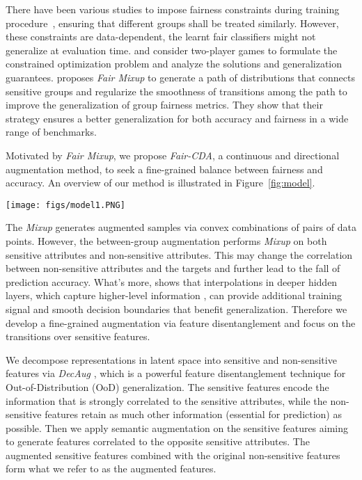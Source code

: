\documentclass[letterpaper]{article} %
\begin{document}
There have been various studies to impose fairness constraints during training procedure~\cite{Zemellearningfair,hardt2016equality,zafar2017fairness,chuang2021fair}, ensuring that different groups shall be treated similarly.
However, these constraints are data-dependent, the learnt fair classifiers might not generalize at evaluation time.
\citet{agarwal2018reductions} and \citet{cotter2019training} consider two-player games to formulate the constrained optimization problem and analyze the solutions and generalization guarantees.
\citet{chuang2021fair} proposes {\it Fair Mixup} to
generate a path of distributions that connects sensitive groups and regularize the smoothness of transitions among the path to improve the generalization of group fairness metrics. 
They show that their strategy ensures a better generalization for both accuracy and fairness in a wide range of benchmarks. 

Motivated by {\it Fair Mixup}, we propose {\it Fair-CDA}, a continuous and directional augmentation method, to seek a fine-grained balance between fairness and accuracy. An overview of our method is illustrated in Figure~\ref{fig:model}.


\begin{figure*}[t]
\centering
\texttt{[image: figs/model1.PNG]}
\caption{An overview of the proposed Fair-CDA.}
\label{fig:model}
\end{figure*}


 The {\it Mixup} \cite{zhang2018mixup} generates augmented samples via convex combinations of pairs
of data points. However, the between-group augmentation performs {\it Mixup} on both sensitive attributes and non-sensitive attributes.
This may change the correlation between non-sensitive attributes and the targets and further lead to the fall of prediction accuracy.
What's more, \citet{verma2019manifold} shows that interpolations in deeper hidden layers, which capture higher-level information \cite{zeiler2014visualizing}, can provide additional training signal and smooth decision boundaries that benefit generalization.
Therefore we develop a fine-grained augmentation via feature disentanglement and focus on the transitions over sensitive features. 


We decompose representations in latent space into sensitive and non-sensitive features via {\it DecAug} \cite{bai2020decaug}, which is a powerful feature disentanglement technique for  Out-of-Distribution (OoD) generalization. 
The sensitive features encode the information that is strongly correlated to the sensitive attributes, while the non-sensitive features retain as much other information (essential for prediction) as possible.
Then we apply semantic augmentation on the sensitive features aiming to generate features correlated to the opposite sensitive attributes. The augmented sensitive features combined with the original non-sensitive features form what we refer to as the augmented features.
\end{document}

